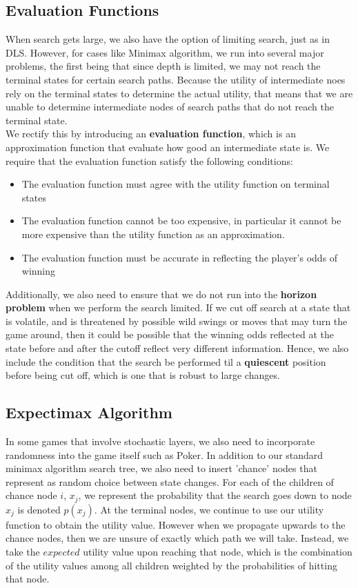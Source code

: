 \documentclass[12pt]{article}
\begin{document}
\subsection{Evaluation Functions}

When search gets large, we also have the option of limiting search, just as in DLS. However, for cases like Minimax algorithm, we run into several major problems, the first being that since depth is limited, we may not reach the terminal states for certain search paths. Because the utility of intermediate noes rely on the terminal states to determine the actual utility, that means that we are unable to determine intermediate nodes of search paths that do not reach the terminal state.\\

We rectify this by introducing an \textbf{evaluation function}, which is an approximation function that evaluate how good an intermediate state is. We require that the evaluation function satisfy the following conditions:

\begin{itemize}
\item The evaluation function must agree with the utility function on terminal states
\item The evaluation function cannot be too expensive, in particular it cannot be more expensive than the utility function as an approximation. 
\item The evaluation function must be accurate in reflecting the player's odds of winning
\end{itemize}

Additionally, we also need to ensure that we do not run into the \textbf{horizon problem} when we perform the search limited. If we cut off search at a state that is volatile, and is threatened by possible wild swings or moves that may turn the game around, then it could be possible that the winning odds reflected at the state before and after the cutoff reflect very different information. Hence, we also include the condition that the search be performed til a \textbf{quiescent} position before being cut off, which is one that is robust to large changes.

\subsection{Expectimax Algorithm}

In some games that involve stochastic layers, we also need to incorporate randomness into the game itself such as Poker. In addition to our standard minimax algorithm search tree, we also need to insert 'chance' nodes that represent as random choice between state changes. For each of the children of chance node $i$, $x_j$, we represent the probability that the search goes down to node $x_j$ is denoted $p(x_j)$. At the terminal nodes, we continue to use our utility function to obtain the utility value. However when we propagate upwards to the chance nodes, then we are unsure of exactly which path we will take. Instead, we take the $expected$ utility value upon reaching that node, which is the combination of the utility values among all children weighted by the probabilities of hitting that node.
\end{document}
